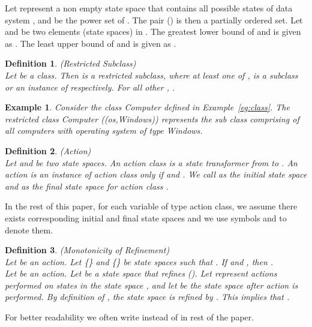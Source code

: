 \documentclass[12pt,journal,letterpaper,onecolumn]{IEEEtran}
\newtheorem{definition}{Definition}[section]
\newtheorem{example}{Example}[section]
\begin{document}
Let  represent a non empty state space that contains all
possible states of data system , and  be the power set
of . The pair () is then a partially
ordered set. Let  and  be two elements (state
spaces) in . The greatest lower bound of  and
 is given as .
The least upper bound of  and  is given as .


\begin{definition}(Restricted Subclass)\\
Let  be a class. Then
 is a restricted subclass,
where at least one of ,  is a subclass or an
instance of  respectively. For all other ,
. \label{def:RestrictedSubclass}
\end{definition}

\begin{example}  Consider the class {\ttfamily Computer} defined
in Example~\ref{eg:class}. The restricted class {\ttfamily
Computer} {\ttfamily((os,Windows))} represents the sub class comprising of all
computers with operating system of type {\ttfamily Windows}.
\end{example}


\begin{definition}(Action)\\
\label{def:action} Let  and  be two state spaces. An
action class  is a state transformer
from  to . An action 
is an instance of action class  only if  and
. We call  as the initial state space and
 as the final state space for action class .
\end{definition}

In the rest of this paper, for each variable  of type action class,
 we assume there exists corresponding initial and final state spaces
 and we use symbols  and  to denote them.

\begin{definition}(Monotonicity of Refinement)\\
\label{def:monotonicity}
Let  be an action. Let \{\} and
\{\} be state spaces such that
. If
 and ,
then .\\

Let  be an action.
Let  be a state space that
refines  ().
Let  represent actions performed
 on states in the state space , and let
  be the state space
 after action  is performed.  By definition of , the state
 space  is refined by  . This
 implies that .

\end{definition}

For better readability we often write
 instead of 
in rest of the paper.
\end{document}
